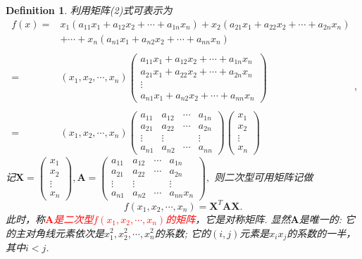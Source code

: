 \documentclass{article}
\newtheorem{definition}[theorem]{Definition}
\newcommand{\mbf}[1]{\bm{#1}}
\newcommand{\redt}[1]{\textcolor{red}{#1}}
\begin{document}
\begin{definition}
\rm 利用矩阵(2)式可表示为
$$
\begin{array}{rl}
f(x) =& x_1(a_{11}x_1 + a_{12}x_2 + \cdots + a_{1n}x_n) + x_2(a_{21}x_1 + a_{22}x_2 + \cdots + a_{2n}x_n) \\ 
&+ \cdots + x_n(a_{n1}x_1 + a_{n2}x_2 + \cdots + a_{nn}x_n) \\ \\
=&(x_1,x_2,\cdots,x_n)
\begin{pmatrix}
a_{11}x_1 + a_{12}x_2 + \cdots + a_{1n}x_n \\
a_{21}x_1 + a_{22}x_2 + \cdots + a_{2n}x_n \\
\vdots \\
a_{n1}x_1 + a_{n2}x_2 + \cdots + a_{nn}x_n
\end{pmatrix} \\ \\
=& (x_1,x_2,\cdots,x_n) 
\begin{pmatrix}
a_{11} & a_{12} & \cdots & a_{1n} \\
a_{21} & a_{22} & \cdots & a_{2n} \\
\vdots & \vdots & 		 & \vdots \\
a_{n1} & a_{n2} & \cdots & a_{nn}
\end{pmatrix}
\begin{pmatrix}
x_1 \\
x_2 \\
\vdots \\
x_n
\end{pmatrix}
\end{array},
$$
记$\mbf{X} = \begin{pmatrix}
x_1 \\
x_2 \\
\vdots \\
x_n
\end{pmatrix}, \mbf{A} = \begin{pmatrix}
a_{11} & a_{12} & \cdots & a_{1n} \\
a_{21} & a_{22} & \cdots & a_{2n} \\
\vdots & \vdots & 		 & \vdots \\
a_{n1} & a_{n2} & \cdots & a_{nn}x_n
\end{pmatrix},$
则二次型可用矩阵记做
$$
f(x_1,x_2,\cdots,x_n)=\mbf{X}^T\mbf{A}\mbf{X}.
$$
此时，称\redt{$\mbf{A}$是二次型$f(x_1,x_2,\cdots,x_n)$的矩阵}，它是对称矩阵. 显然$\mbf{A}$是唯一的: 它的主对角线元素依次是$x_1^2,x_2^2,\cdots,x_n^2$的系数; 它的$(i,j)$元素是$x_ix_j$的系数的一半，其中$i<j$. 
\end{definition}
\end{document}
